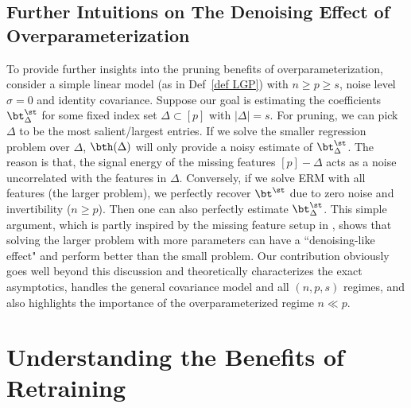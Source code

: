 \subsection{Further Intuitions on The Denoising Effect of Overparameterization}
To provide further insights into the pruning benefits of overparameterization, consider a simple linear model (as in Def~\ref{def LGP}) with $n\geq p\geq s$, noise level $\sigma=0$ and identity covariance. Suppose our goal is estimating the coefficients $\bt^\st_{\Delta}$ for some fixed index set $\Delta\subset[p]$ with $|\Delta|=s$. For pruning, we can pick $\Delta$ to be the most salient/largest entries. If we solve the smaller regression problem over $\Delta$, $\bth(\Delta)$ will only provide a noisy estimate of $\bt^\st_{\Delta}$. The reason is that, the signal energy of the missing features $[p]-\Delta$ acts as a noise uncorrelated with the features in $\Delta$. Conversely, if we solve ERM with all features (the larger problem), we perfectly recover  $\bt^\st$ due to zero noise and invertibility ($n\geq p$). Then one can also perfectly estimate $\bt^\st_{\Delta}$. This simple argument, which is partly inspired by the missing feature setup in \cite{hastie2019surprises}, shows that solving the larger problem with more parameters can have a ``denoising-like effect" and perform better than the small problem. Our contribution obviously goes well beyond this discussion and theoretically characterizes the exact asymptotics, handles the general covariance model and all $(n,p,s)$ regimes, and also highlights the importance of the overparameterized regime $n\ll p$.
\section{Understanding the Benefits of Retraining}\label{sec intu}


